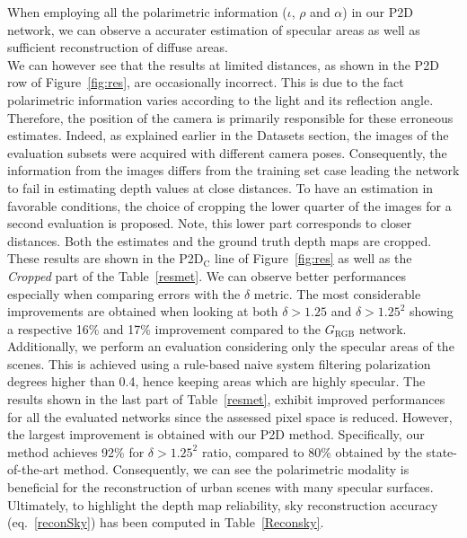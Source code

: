 When employing all the polarimetric information ($\iota$, $\rho$ and $\alpha$) in our P2D network, we can observe a accurater estimation of specular areas as well as sufficient reconstruction of diffuse areas.\\
We can however see that the results at limited distances, as shown in the P2D row of Figure~\ref{fig:res}, are occasionally incorrect.
This is due to the fact polarimetric information varies according to the light and its reflection angle. Therefore, the position of the camera is primarily responsible for these erroneous estimates.
Indeed, as explained earlier in the Datasets section, the images of the evaluation subsets were acquired with different camera poses. Consequently, the information from the images differs from the training set case leading the network to fail in estimating depth values at close distances. 
To have an estimation in favorable conditions, the choice of cropping the lower quarter of the images for a second evaluation is proposed. Note, this lower part corresponds to closer distances. Both the estimates and the ground truth depth maps are cropped. 
These results are shown in the P2D$_\textrm{C}$ line of Figure~\ref{fig:res} as well as the \textit{Cropped} part of the Table~\ref{resmet}. We can observe better performances especially when comparing errors with the $\delta$ metric. The most considerable improvements are obtained when looking at both $\delta > 1.25$ and $\delta > 1.25^2$ showing a respective 16\% and 17\% improvement compared to the $G_{\textrm{RGB}}$ network.\\

Additionally, we perform an evaluation considering only the specular areas of the scenes. This is achieved using a rule-based naive system filtering polarization degrees higher than 0.4, hence keeping areas which are highly specular. 
The results shown in the last part of Table~\ref{resmet}, exhibit improved performances for all the evaluated networks since the assessed pixel space is reduced. However, the largest improvement is obtained with our P2D method. Specifically, our method achieves 92\% for $\delta > 1.25^2$ ratio, compared to 80\% obtained by the state-of-the-art method.
Consequently, we can see the polarimetric modality is beneficial for the reconstruction of urban scenes with many specular surfaces. 
Ultimately, to highlight the depth map reliability, sky reconstruction accuracy (eq.~\ref{reconSky}) has been computed in Table~\ref{Reconsky}.\\

